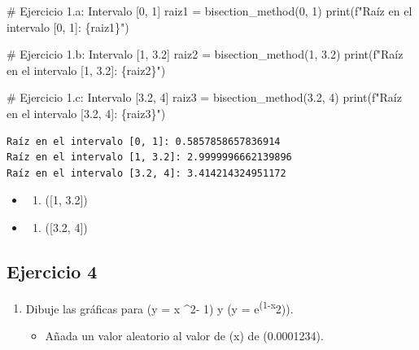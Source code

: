 \documentclass[
  letterpaper,
  DIV=11,
  numbers=noendperiod]{scrartcl}
\newenvironment{Shaded}{\begin{snugshade}}{\end{snugshade}}
\newcommand{\BuiltInTok}[1]{\textcolor[rgb]{0.00,0.23,0.31}{#1}}
\newcommand{\CommentTok}[1]{\textcolor[rgb]{0.37,0.37,0.37}{#1}}
\newcommand{\DecValTok}[1]{\textcolor[rgb]{0.68,0.00,0.00}{#1}}
\newcommand{\FloatTok}[1]{\textcolor[rgb]{0.68,0.00,0.00}{#1}}
\newcommand{\NormalTok}[1]{\textcolor[rgb]{0.00,0.23,0.31}{#1}}
\newcommand{\OperatorTok}[1]{\textcolor[rgb]{0.37,0.37,0.37}{#1}}
\newcommand{\SpecialCharTok}[1]{\textcolor[rgb]{0.37,0.37,0.37}{#1}}
\newcommand{\SpecialStringTok}[1]{\textcolor[rgb]{0.13,0.47,0.30}{#1}}
\providecommand{\tightlist}{%
  \setlength{\itemsep}{0pt}\setlength{\parskip}{0pt}}\usepackage{longtable,booktabs,array}
\begin{document}
\begin{Shaded}
\begin{Highlighting}[]
\CommentTok{\# Ejercicio 1.a: Intervalo [0, 1]}
\NormalTok{raiz1 }\OperatorTok{=}\NormalTok{ bisection\_method(}\DecValTok{0}\NormalTok{, }\DecValTok{1}\NormalTok{)}
\BuiltInTok{print}\NormalTok{(}\SpecialStringTok{f"Raíz en el intervalo [0, 1]: }\SpecialCharTok{\{}\NormalTok{raiz1}\SpecialCharTok{\}}\SpecialStringTok{"}\NormalTok{)}

\CommentTok{\# Ejercicio 1.b: Intervalo [1, 3.2]}
\NormalTok{raiz2 }\OperatorTok{=}\NormalTok{ bisection\_method(}\DecValTok{1}\NormalTok{, }\FloatTok{3.2}\NormalTok{)}
\BuiltInTok{print}\NormalTok{(}\SpecialStringTok{f"Raíz en el intervalo [1, 3.2]: }\SpecialCharTok{\{}\NormalTok{raiz2}\SpecialCharTok{\}}\SpecialStringTok{"}\NormalTok{)}

\CommentTok{\# Ejercicio 1.c: Intervalo [3.2, 4]}
\NormalTok{raiz3 }\OperatorTok{=}\NormalTok{ bisection\_method(}\FloatTok{3.2}\NormalTok{, }\DecValTok{4}\NormalTok{)}
\BuiltInTok{print}\NormalTok{(}\SpecialStringTok{f"Raíz en el intervalo [3.2, 4]: }\SpecialCharTok{\{}\NormalTok{raiz3}\SpecialCharTok{\}}\SpecialStringTok{"}\NormalTok{)}
\end{Highlighting}
\end{Shaded}

\begin{verbatim}
Raíz en el intervalo [0, 1]: 0.5857858657836914
Raíz en el intervalo [1, 3.2]: 2.9999996662139896
Raíz en el intervalo [3.2, 4]: 3.414214324951172
\end{verbatim}

\begin{itemize}
\tightlist
\item
  \begin{enumerate}
  \def\labelenumi{\alph{enumi}.}
  \setcounter{enumi}{1}
  \tightlist
  \item
    ({[}1, 3.2{]})
  \end{enumerate}
\item
  \begin{enumerate}
  \def\labelenumi{\alph{enumi}.}
  \setcounter{enumi}{2}
  \tightlist
  \item
    ({[}3.2, 4{]})
  \end{enumerate}
\end{itemize}

\subsection{Ejercicio 4}\label{ejercicio-4}

\begin{enumerate}
\def\labelenumi{\arabic{enumi}.}
\tightlist
\item
  Dibuje las gráficas para (y = x \^{}2- 1) y (y =
  e\textsuperscript{(1-x}2)).

  \begin{itemize}
  \tightlist
  \item
    Añada un valor aleatorio al valor de (x) de (0.0001234).
  \end{itemize}
\end{enumerate}
\end{document}
